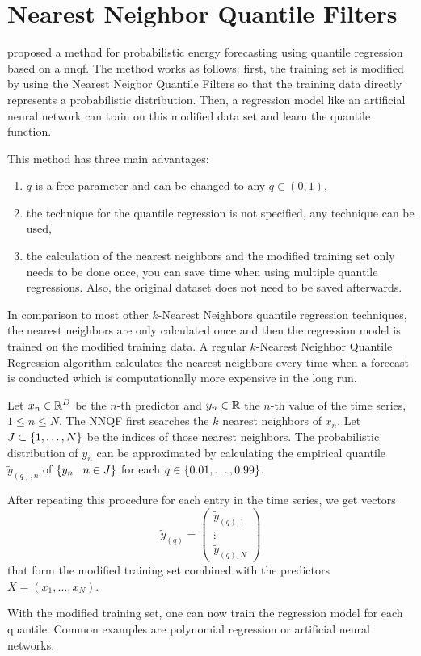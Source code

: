 \section{Nearest Neighbor Quantile Filters}
\label{sec:nnqf}

\Textcite{Ordiano2019} proposed a method for probabilistic 
energy forecasting using quantile regression based on a \gls{nnqf}. 
The method works as follows: first, the training set is modified 
by using the Nearest Neigbor Quantile Filters so that 
the training data directly represents a probabilistic distribution. 
Then, a regression model like an artificial neural network can 
train on this modified data set and learn the quantile function.

This method has three main advantages: 
\begin{enumerate}
    \item \(q\) is a free parameter and can be changed to any \(q \in (0,1)\),
    \item the technique for the quantile regression is not specified, 
    any technique can be used,
    \item the calculation of the nearest neighbors and the modified 
    training set only needs to be done once, you can save time when 
    using multiple quantile regressions. Also, the original dataset 
    does not need to be saved afterwards.
\end{enumerate}

In comparison to most other \(k\)-Nearest Neighbors quantile 
regression techniques, the nearest neighbors are only calculated once 
and then the regression model is trained on the modified training data. 
A regular \(k\)-Nearest Neighbor Quantile Regression algorithm 
calculates the nearest neighbors every time when a forecast is conducted 
which is computationally more expensive in the long run.

Let \(x_n \in \mathbb{R}^D\) be the \(n\)-th predictor 
and \(y_n \in \mathbb{R}\) the \(n\)-th value of the time series, \(1 \leq n \leq N\). 
The NNQF first searches the \(k\) nearest neighbors of \(x_n\). 
Let \(J \subset \{1, \ldots, N\}\) be the indices of 
those nearest neighbors. 
The probabilistic distribution of \(y_n\) can be approximated 
by calculating the empirical quantile \(\tilde{y}_{(q),n}\) of 
\(\{y_n \;|\; n\in J\}\) for each \(q \in \{0.01, \ldots, 0.99\}\). 

After repeating this procedure for each entry in the time series, 
we get vectors 
\[ \tilde{y}_{(q)} = \begin{pmatrix}
    \tilde{y}_{(q), 1} \\ 
    \vdots \\
    \tilde{y}_{(q), N}
\end{pmatrix} \]
that form the modified training set combined with the 
predictors \(X = (x_1, \ldots, x_N)\).

With the modified training set, one can now train the regression model 
for each quantile. Common examples are polynomial regression or 
artificial neural networks. 